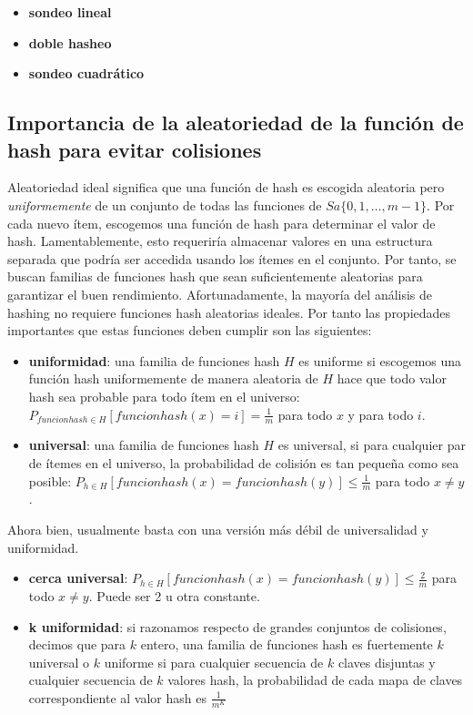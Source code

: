 \begin{itemize}
    \item \textbf{sondeo lineal}
      \item \textbf{doble hasheo}
        \item \textbf{sondeo cuadrático}
\end{itemize}
\subsection{Importancia de la aleatoriedad de la función de hash para evitar colisiones}

Aleatoriedad ideal significa que una función de hash es escogida aleatoria pero \textit{uniformemente} de un conjunto de todas las funciones de $S a \{0,1,\ldots, m-1\}$. Por cada nuevo ítem, escogemos una función de hash para determinar el valor de hash. Lamentablemente, esto requeriría almacenar valores en una estructura separada que podría ser accedida usando  los ítemes en el conjunto. Por tanto, se buscan familias de funciones hash que sean suficientemente aleatorias para garantizar el buen rendimiento. Afortunadamente, la mayoría del análisis de hashing no requiere funciones hash aleatorias ideales. Por tanto las propiedades importantes que estas funciones deben cumplir son las siguientes:

\begin{itemize}
    \item \textbf{uniformidad}: una familia de funciones hash $H$ es uniforme si escogemos una función hash uniformemente de manera aleatoria de $H$ hace que todo valor hash sea probable para todo ítem en el universo: $P_{funcionhash \in H} [funcionhash(x)=i]=\frac{1}{m}$ para todo $x$ y para todo $i$.
    \item \textbf{universal}: una familia de funciones hash $H$ es universal, si para cualquier par de ítemes en el universo, la probabilidad de colisión es tan pequeña como sea posible: $P_{h \in H}[funcionhash(x)=funcionhash(y)] \leq \frac {1}{m}$ para todo $x \neq y$.
    
\end{itemize}
Ahora bien, usualmente basta con una versión más débil de universalidad y uniformidad.


\begin{itemize}
    \item \textbf{cerca universal}:  $P_{h \in H}[funcionhash(x)=funcionhash(y)] \leq \frac {2}{m}$ para todo $x \neq y$. Puede ser 2 u otra constante.
    
    \item \textbf{k uniformidad}: si razonamos respecto de grandes conjuntos de colisiones, decimos que para $k$ entero, una familia de funciones hash es 
 fuertemente $k$ universal o $k$ uniforme si para cualquier secuencia de $k$ claves disjuntas y cualquier secuencia de $k$ valores hash, la probabilidad de cada mapa de claves correspondiente al valor hash es $\frac {1}{m^K}$
\end{itemize}


